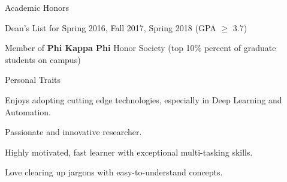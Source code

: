 \documentclass{resume} %
\begin{document}
\begin{rSection}{Academic Honors}
    \begin{rSubsection}{}{}{}{}
        \item Dean's List for Spring 2016, Fall 2017, Spring 2018 (GPA $\geq$ 3.7)
        \item Member of \textbf{Phi Kappa Phi} Honor Society (top 10\% percent of graduate students on campus)
    \end{rSubsection}
\end{rSection}


\begin{rSection}{Personal Traits}
    \begin{rSubsection}{}{}{}{}
        \item Enjoys adopting cutting edge technologies, especially in Deep Learning and Automation.
        \item Passionate and innovative researcher.
        \item Highly motivated, fast learner with exceptional multi-tasking skills.
        \item Love clearing up jargons with easy-to-understand concepts.
    \end{rSubsection}
\end{rSection}
\end{document}
